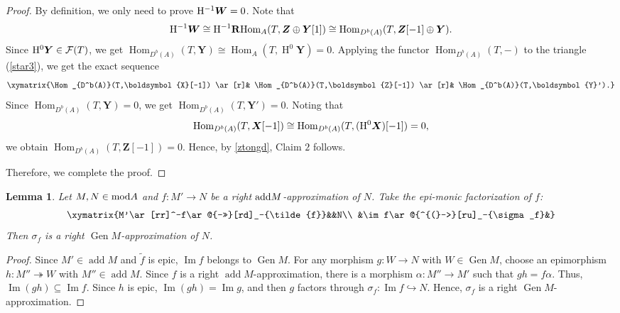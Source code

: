 \documentclass[reqno,12pt]{amsart}
\numberwithin{equation}{section}
\theoremstyle{plain}
\newtheorem{lemma}[theorem]{\bf Lemma}
\theoremstyle{definition}
\begin{document}
\begin{proof}
By definition, we only need to prove ${\rm H}^{-1}\boldsymbol{W}=0$. Note that
\begin{equation}\label{ztongd}
{\rm H}^{-1}\boldsymbol{W}\cong{\rm H}^{-1}\mathbf{R}\mbox{\rm Hom}_A(T, \boldsymbol{Z} \oplus \boldsymbol{Y}[1])
\cong \operatorname{Hom}_{D^b(A)}(T, \boldsymbol{Z}[-1] \oplus \boldsymbol{Y}).\end{equation}
Since ${\rm H}^{0}\boldsymbol{Y} \in \mathcal{F}(T)$, we get $\operatorname{Hom}_{D^b(A)}(T, \boldsymbol{Y}) \cong \operatorname{Hom}_{A}(T, \operatorname{H}^{0} \boldsymbol{Y})=0$. Applying the functor $\operatorname{Hom}_{D^b(A)}(T,-)$ to the triangle (\ref{star3}), we get the exact sequence
\[\xymatrix{\Hom_{D^b(A)}(T,\boldsymbol{X}[-1]) \ar[r]& \Hom_{D^b(A)}(T,\boldsymbol{Z}[-1]) \ar[r]&  \Hom_{D^b(A)}(T,\boldsymbol{Y}').}\]
Since $\operatorname{Hom}_{D^b(A)}(T, \boldsymbol{Y})=0$, we get $\operatorname{Hom}_{D^b(A)}(T,\boldsymbol{Y}')=0$. Noting that $$\mbox{\rm Hom}_{D^b(A)}(T,\boldsymbol{X}[-1]) \cong \mbox{\rm Hom}_{D^b(A)}(T,({\rm H}^{0}\boldsymbol{X})[-1])=0,$$ we obtain $\operatorname{Hom}_{D^b(A)}(T,\boldsymbol{Z}[-1])=0$. Hence, by \eqref{ztongd}, Claim $2$ follows.

Therefore, we complete the proof.
\end{proof}



\begin{lemma}\label{add-gen}
Let $M, N \in {\rm mod}A$ and $f:M'\rightarrow N$ be a right ${\rm add}M$-approximation of $N$. Take the epi-monic factorization of $f$:
$$\xymatrix{M'\ar[rr]^-f\ar@{->>}[rd]_-{\tilde{f}}&&N\\
&\im f\ar@{^{(}->}[ru]_-{\sigma_f}&}$$
Then $\sigma_f$ is a right $\operatorname{Gen}M$-approximation of $N$.
\end{lemma}
\begin{proof}
Since $M'\in\operatorname{add}M$ and $\widetilde f$ is epic,
$\operatorname{Im}f$ belongs to $\operatorname{Gen}M$. For any morphism
$g:W\to N$ with $W\in\operatorname{Gen}M$, choose an epimorphism
$h:M''\twoheadrightarrow W$ with $M''\in\operatorname{add}M$. Since $f$ is a
right $\operatorname{add}M$-approximation, there is a morphism
$\alpha:M''\to M'$ such that $gh=f\alpha$. Thus,
$\operatorname{Im}(gh)\subseteq\operatorname{Im}f$. Since $h$ is epic,
$\operatorname{Im}(gh)=\operatorname{Im}g$, and then $g$ factors through
$\sigma_f:\operatorname{Im}f\hookrightarrow N$. Hence, $\sigma_f$ is a right
$\operatorname{Gen}M$-approximation.
\end{proof}
\end{document}

